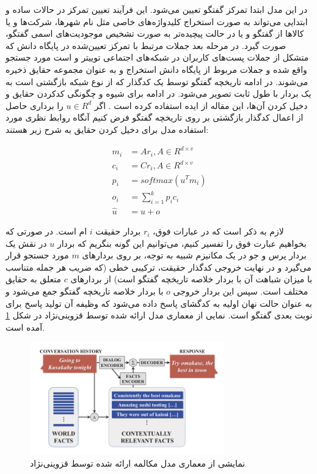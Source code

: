 در این مدل ابتدا تمرکز گفتگو تعیین می‌شود. این فرآیند تعیین تمرکز در حالات ساده و ابتدایی می‌تواند به صورت استخراج کلیدواژه‌های خاصی مثل نام شهر‌ها، شرکت‌ها و یا کالا‌ها از گفتگو و یا در حالت پیچیده‌تر به صورت تشخیص موجودیت‌های اسمی
گفتگو، صورت گیرد.
در مرحله بعد جملات مرتبط با تمرکز تعیین‌شده در پایگاه دانش که متشکل از جملات پست‌های کاربران در شبکه‌های اجتماعی توییتر
و
است مورد جستجو واقع شده و جملات مربوط از پایگاه دانش استخراج و به عنوان مجموعه حقایق ذخیره می‌شوند.
در ادامه تاریخچه گفتگو توسط یک کدگذار که از نوع شبکه بازگشتی است به یک بردار با طول ثابت تصویر می‌شود. در ادامه برای شیوه و چگونگی کدکردن حقایق و دخیل کردن آن‌ها، این مقاله از ایده 
استفاده کرده است
\cite{weston2014memory}
. اگر
$u \in R^d$
را برداری 
حاصل از اعمال کدگذار بازگشتی بر روی تاریخچه گفتگو فرض کنیم آنگاه روابط نظری مورد استفاده مدل برای دخیل کردن حقایق به شرح زیر هستند:

\begin{equation}
\label{eq:a_knowledge_ground}
\begin{split}
m_i &= Ar_i , A \in R^{d \times v} \\
c_i &= Cr_i , A \in R^{d \times v} \\
p_i &= softmax(u^T m_i) \\ 
o_i &= \sum_{i=1}^{k} p_i c_i \\
\hat{u} &= u + o
\end{split}\end{equation}

لازم به ذکر است که در عبارات فوق،
$r_i$
بردار
 حقیقت
$i$
ام است.
در صورتی که بخواهیم عبارت فوق را تفسیر کنیم، می‌توانیم این گونه بنگریم که بردار
$u$
در نقش یک بردار پرس و جو در یک مکانیزم شبیه به توجه، بر روی بردارهای 
$m$
مورد جستجو قرار می‌گیرد و در نهایت خروجی کدگذار حقیقت، ترکیبی خطی (که ضریب هر جمله متناسب با میزان شباهت آن با بردار خلاصه تاریخچه گفتگو است)
از بردار‌های
$c$
متعلق به حقایق مختلف است.
سپس این بردار خروجی
$o$
با بردار خلاصه تاریخچه گفتگو جمع می‌شود و به عنوان حالت نهان اولیه به
کدگشای پاسخ داده می‌شود که وظیفه آن تولید پاسخ برای نوبت بعدی گفتگو است. نمایی از معماری مدل ارائه شده توسط قزوینی‌نژاد در شکل
\ref{fig:chap2:qazvini-arch}
آمده است.

 \begin{figure}[H]
	\centering
	\includegraphics[width=0.75\textwidth]{images/chap2/qazvini-arch.png}
	\caption[نمایشی از معماری مدل مکالمه ارائه شده توسط قزوینی‌نژاد]
	{نمایشی از معماری مدل مکالمه ارائه شده توسط قزوینی‌نژاد
		\cite{a_knowledge_grounded}}	
	\label{fig:chap2:qazvini-arch}
\end{figure}

